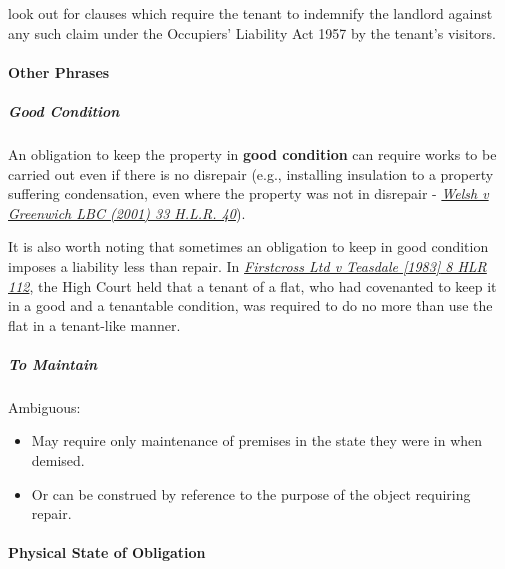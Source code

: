 \documentclass[
]{article}
\providecommand{\tightlist}{%
  \setlength{\itemsep}{0pt}\setlength{\parskip}{0pt}}
\begin{document}
look out for clauses which require the tenant to indemnify the landlord
against any such claim under the Occupiers' Liability Act 1957 by the
tenant's visitors.

\hypertarget{other-phrases}{%
\paragraph{Other Phrases}\label{other-phrases}}

\hypertarget{good-condition}{%
\subparagraph{Good Condition}\label{good-condition}}

An obligation to keep the property in \textbf{good condition} can
require works to be carried out even if there is no disrepair (e.g.,
installing insulation to a property suffering condensation, even where
the property was not in disrepair -
\emph{\href{https://uk.practicallaw.thomsonreuters.com/D-008-7715?originationContext=document\&transitionType=PLDocumentLink\&contextData=(sc.Default)\&ppcid=47d8e69b58514ba1976c981efd5911b3\&comp=pluk}{Welsh
v Greenwich LBC (2001) 33 H.L.R. 40}}).

It is also worth noting that sometimes an obligation to keep in good
condition imposes a liability less than repair. In
\emph{\href{https://uk.practicallaw.thomsonreuters.com/D-023-2581?originationContext=document\&transitionType=PLDocumentLink\&contextData=(sc.Default)\&ppcid=47d8e69b58514ba1976c981efd5911b3}{Firstcross
Ltd v Teasdale {[}1983{]} 8 HLR 112}}, the High Court held that a tenant
of a flat, who had covenanted to keep it in a good and a tenantable
condition, was required to do no more than use the flat in a tenant-like
manner.

\hypertarget{to-maintain}{%
\subparagraph{To Maintain}\label{to-maintain}}

Ambiguous:

\begin{itemize}
\tightlist
\item
  May require only maintenance of premises in the state they were in
  when demised.
\item
  Or can be construed by reference to the purpose of the object
  requiring repair.
\end{itemize}

\hypertarget{physical-state-of-obligation}{%
\paragraph{Physical State of
Obligation}\label{physical-state-of-obligation}}
\end{document}
